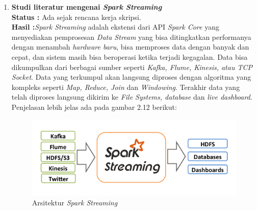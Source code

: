 \documentclass[a4paper,twoside]{article}
\begin{document}
\begin{enumerate}

		\item \textbf{Studi literatur mengenai \textit{Spark Streaming}} \\
		{\bf Status :} Ada sejak rencana kerja skripsi.\\
		{\bf Hasil :}\textit{Spark Streaming} adalah ekstensi dari API \textit{Spark Core} yang 				menyediakan pemprosesan \textit{Data Stream} yang bisa ditingkatkan performanya dengan 					menambah \textit{hardware baru}, bisa memproses data dengan banyak dan cepat, dan sistem 				masih bisa beroperasi ketika terjadi kegagalan. Data bisa dikumpulkan dari berbagai sumber 				seperti \textit{Kafka, Flume, Kinesis, atau TCP Socket}. Data yang terkumpul akan langsung 				diproses dengan algoritma yang kompleks seperti \textit{Map, Reduce, Join} dan 							\textit{Windowing}. Terakhir data yang telah diproses langsung dikirim ke \textit{File 					Systems, database} dan \textit{live dashboard}. Penjelasan lebih jelas ada pada gambar 2.12 			berikut:

		\begin{figure}[H] 
		\centering  
		\includegraphics[scale=0.7]{streaming-arch}  
		\caption[Gambar Arsitektur {\it Spark Streaming}]{Arsitektur {\it Spark Streaming}} 
		\label{fig:processing-events relationship} 
		\end{figure}
		

\end{enumerate}
\end{document}

